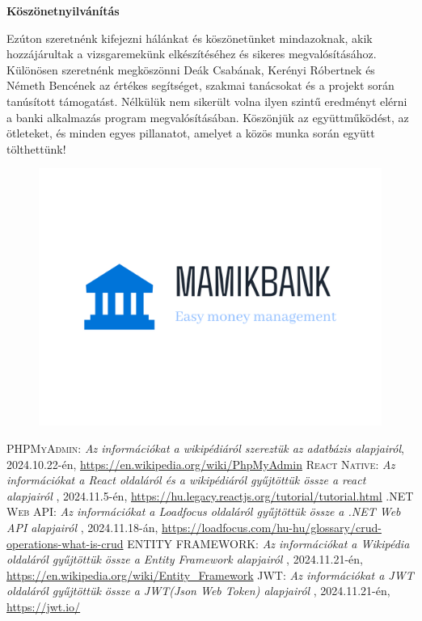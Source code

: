 \documentclass[colorlinks]{thesis-kando}
\theoremstyle{definition}
\theoremstyle{remark}
\begin{document}
\newpage
\Huge\begin{center}
	\textbf{Köszönetnyilvánítás}	
\end{center}\normalsize
Ezúton szeretnénk kifejezni hálánkat és köszönetünket mindazoknak, akik hozzájárultak a vizsgaremekünk elkészítéséhez és sikeres megvalósításához.
\newline
\newline
Különösen szeretnénk megköszönni Deák Csabának, Kerényi Róbertnek és Németh Bencének az értékes segítséget, szakmai tanácsokat és a projekt során tanúsított támogatást. Nélkülük nem sikerült volna ilyen szintű eredményt elérni a banki alkalmazás program megvalósításában.
\newline
Köszönjük az együttműködést, az ötleteket, és minden egyes pillanatot, amelyet a közös munka során együtt tölthettünk!
\begin{figure}[h]
    \centering
    \includegraphics[width=\textwidth]{figures/mamikbank-high-resolution-logo.png}

\end{figure}

\begin{thebibliography}{2}
 \textsc{PHPMyAdmin}: \emph{Az információkat a wikipédiáról szereztük az adatbázis alapjairól}, 2024.10.22-én, \url{https://en.wikipedia.org/wiki/PhpMyAdmin}
 \textsc{React Native}: \emph{Az információkat a React oldaláról és a wikipédiáról gyűjtöttük össze a react alapjairól }, 2024.11.5-én, \url{https://hu.legacy.reactjs.org/tutorial/tutorial.html}
 \textsc{.NET Web API}: \emph{Az információkat a Loadfocus oldaláról  gyűjtöttük össze a .NET Web API alapjairól }, 2024.11.18-án, \url{https://loadfocus.com/hu-hu/glossary/crud-operations-what-is-crud}
 \textsc{ENTITY FRAMEWORK}: \emph{Az információkat a Wikipédia oldaláról  gyűjtöttük össze a Entity Framework alapjairól }, 2024.11.21-én, \url{https://en.wikipedia.org/wiki/Entity_Framework}
 \textsc{JWT}: \emph{Az információkat a JWT oldaláról  gyűjtöttük össze a JWT(Json Web Token) alapjairól }, 2024.11.21-én, \url{https://jwt.io/}
\end{thebibliography}

%
\end{document}
